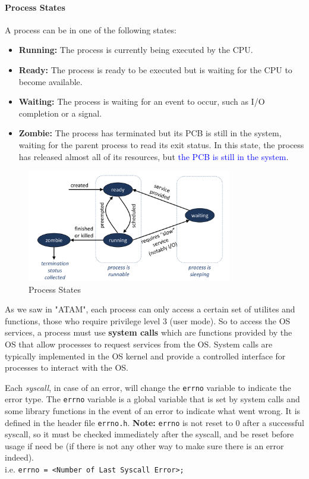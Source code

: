 \documentclass[openany,12pt]{book}
\begin{document}
\paragraph{Process States}
A process can be in one of the following states:
\begin{itemize}
    \item \textbf{Running:} The process is currently being executed by the CPU.
    \item \textbf{Ready:} The process is ready to be executed but is waiting for the CPU to become available.
    \item \textbf{Waiting:} The process is waiting for an event to occur, such as I/O completion or a signal.
    \item \textbf{Zombie:} The process has terminated but its PCB is still in the system, waiting for the parent process to read its exit status. In this state, the process has released almost all of its resources, but \textcolor{blue}{the PCB is still in the system}.
\end{itemize}



\begin{figure}
    \centering
    \includegraphics[width=0.8\textwidth]{../Assets/process_states.png}
    \caption{Process States}
    \label{fig:process_states}
\end{figure}


As we saw in "ATAM", each process can only access a certain set of utilites and functions, those who require privilege level 3 (user mode). So to access the OS services, a process must use \textbf{system calls} which are functions provided by the OS that allow processes to request services from the OS. System calls are typically implemented in the OS kernel and provide a controlled interface for processes to interact with the OS.

\vspace{1em}

Each \textit{syscall}, in case of an error, will change the \texttt{errno} variable to indicate the error type. The \texttt{errno} variable is a global variable that is set by system calls and some library functions in the event of an error to indicate what went wrong. It is defined in the header file \texttt{errno.h}. {\color{blue}\textbf{Note:} \texttt{errno} is not reset to 0 after a successful syscall, so it must be checked immediately after the syscall, and be reset before usage if need be} (if there is not any other way to make sure there is an error indeed).\\
i.e. \texttt{errno = <Number of Last Syscall Error>;}
\end{document}
